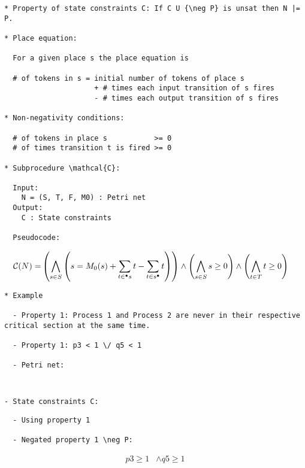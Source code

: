 \begin{verbatim}
* Property of state constraints C: If C U {\neg P} is unsat then N |= P.

* Place equation:
  
  For a given place s the place equation is

  # of tokens in s = initial number of tokens of place s
                     + # times each input transition of s fires
                     - # times each output transition of s fires

* Non-negativity conditions:

  # of tokens in place s           >= 0
  # of times transition t is fired >= 0

* Subprocedure \mathcal{C}:

  Input:
    N = (S, T, F, M0) : Petri net
  Output:
    C : State constraints

  Pseudocode:

\end{verbatim}

\begin{align*}
  \mathcal{C}(N) =& \left( \bigwedge_{s \in S} \left(
    s = M_0(s) + \sum_{t \in \prescript{\bullet}{}{s}} t - \sum_{t \in s^{\bullet}} t
  \right) \right) \land
    \left( \bigwedge_{s \in S} s \ge 0 \right) \land
    \left( \bigwedge_{t \in T} t \ge 0 \right)
\end{align*}

\newpage

\begin{verbatim}
* Example

  - Property 1: Process 1 and Process 2 are never in their respective critical section at the same time.

  - Property 1: p3 < 1 \/ q5 < 1

  - Petri net:

\end{verbatim}

% 

\newpage

\begin{verbatim}
  
\end{verbatim}

\iffalse
\begin{verbatim}
  - State constraints C:
    p1    = 1 - s1      + s3
    ^       ^   ^         ^
    |       |   |         |
    |       |   |         |
    |       |   |         |
    |       |   |        # of tokens given to p1
    |       |   |    
    |       |  # of tokens taken from p1
    |       |
    |      initial number of tokens in p1
    |
    number of tokens in p1
\end{verbatim}
\fi

\begin{verbatim}
- State constraints C:
\end{verbatim}



\begin{verbatim}
  - Using property 1
  
  - Negated property 1 \neg P:
\end{verbatim}

\begin{align*}
     p3 \ge 1 & \land q5 \ge 1
\end{align*}

\fi


